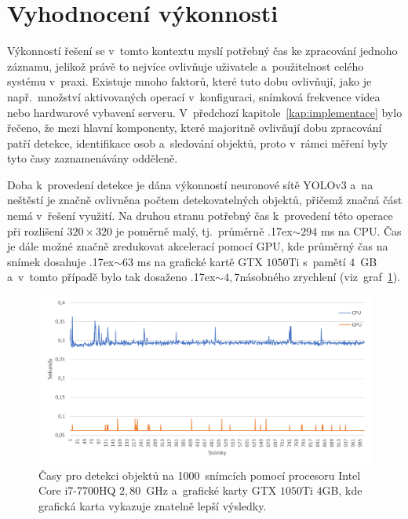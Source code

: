 \section{Vyhodnocení výkonnosti}
Výkonností řešení se v~tomto kontextu myslí potřebný čas ke zpracování jednoho záznamu, jelikož právě to nejvíce ovlivňuje uživatele a~použitelnost celého systému v~praxi. Existuje mnoho faktorů, které tuto dobu ovlivňují, jako je např.~množství aktivovaných operací v~konfiguraci, snímková frekvence videa nebo hardwarové vybavení serveru. V~předchozí kapitole~\ref{kap:implementace} bylo řečeno, že mezi hlavní komponenty, které majoritně ovlivňují dobu zpracování patří detekce, identifikace osob a~sledování objektů, proto v~rámci měření byly tyto časy zaznamenávány odděleně.

Doba k~provedení detekce je dána výkonností neuronové sítě YOLOv3 a~na neštěstí je značně ovlivněna počtem detekovatelných objektů, přičemž značná část nemá v~řešení využití. Na druhou stranu potřebný čas k~provedení této operace při rozlišení $320\times320$ je poměrně malý, tj.~průměrně {\raise.17ex\hbox{$\scriptstyle\sim$}}$294$ ms na CPU. Čas je dále možné značně zredukovat akcelerací pomocí GPU, kde průměrný čas na snímek dosahuje {\raise.17ex\hbox{$\scriptstyle\sim$}}$63$ ms na grafické kartě GTX $1050$Ti s~pamětí $4$~GB a~v~tomto případě bylo tak dosaženo {\raise.17ex\hbox{$\scriptstyle\sim$}}$4,7$násobného zrychlení (viz~graf~\ref{img:cpuVSgpu}).

\begin{figure}[hbt]
	\centering
	\setlength{\fboxsep}{0pt}
	\includegraphics[width=1.0\textwidth]{obrazky-figures/detection_cpu_gpu_times.pdf}
	\caption{Časy pro detekci objektů na 1000~snímcích pomocí procesoru Intel Core i7-7700HQ $2,80$~GHz a~grafické karty GTX $1050$Ti $4$GB, kde grafická karta vykazuje znatelně lepší výsledky.}
	\label{img:cpuVSgpu}
\end{figure}


